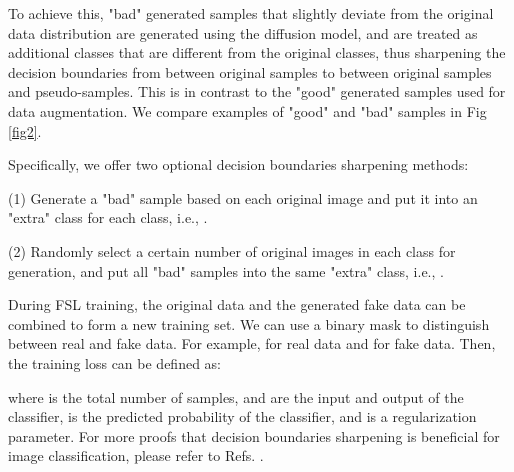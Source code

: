 \documentclass{article}
\begin{document}
To achieve this, "bad" generated samples that slightly deviate from the original data distribution are generated using the diffusion model, and are treated as additional classes that are different from the original classes, thus sharpening the decision boundaries from between original samples to between original samples and pseudo-samples. This is in contrast to the "good" generated samples used for data augmentation. We compare examples of "good" and "bad" samples in Fig \ref{fig2}. 


\begin{figure*}
	\centering
	\centering
	\caption{Comparison of the raw data and the pseudo-data generated by the two modules in Meta-DM. We obtain "good" and "bad" generated samples by adjusting the strength of diffusion models. Our generator is based on the design of von Platen et al. \cite{i25}. }
	\label{fig2}
\end{figure*}


Specifically, we offer two optional decision boundaries sharpening methods: 


(1) Generate a "bad" sample based on each original image and put it into an "extra" class for each class, i.e., .


(2) Randomly select a certain number of original images in each class for generation, and put all "bad" samples into the same "extra" class, i.e., .


 During FSL training, the original data and the generated fake data can be combined to form a new training set. We can use a binary mask  to distinguish between real and fake data. For example,  for real data and  for fake data. Then, the training loss can be defined as:



where  is the total number of samples,  and  are the input and output of the classifier,  is the predicted probability of the classifier, and  is a regularization parameter. For more proofs that decision boundaries sharpening is beneficial for image classification, please refer to Refs. \cite{i3,i35}. 
\end{document}
